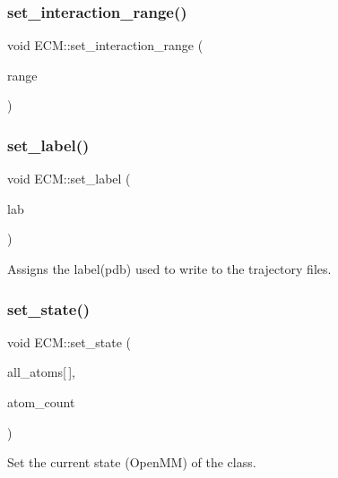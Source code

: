 \subsubsection{\texorpdfstring{set\_interaction\_range()}{set\_interaction\_range()}}
{\footnotesize\ttfamily void E\+C\+M\+::set\+\_\+interaction\+\_\+range (\begin{DoxyParamCaption}\item[{double}]{range }\end{DoxyParamCaption})\hspace{0.3cm}{\ttfamily [inline]}}

\mbox{\label{classECM_aa2f9122b1b849ab31856464889d328f4}} 
\subsubsection{\texorpdfstring{set\_label()}{set\_label()}}
{\footnotesize\ttfamily void E\+C\+M\+::set\+\_\+label (\begin{DoxyParamCaption}\item[{std\+::string}]{lab }\end{DoxyParamCaption})\hspace{0.3cm}{\ttfamily [inline]}}

Assigns the label(pdb) used to write to the trajectory files. \mbox{\label{classECM_aa668c3991fcee9ac12c78383f0c0b0aa}} 
\subsubsection{\texorpdfstring{set\_state()}{set\_state()}}
{\footnotesize\ttfamily void E\+C\+M\+::set\+\_\+state (\begin{DoxyParamCaption}\item[{\mbox{\hyperlink{structMyAtomInfo}{My\+Atom\+Info}}}]{all\+\_\+atoms\mbox{[}$\,$\mbox{]},  }\item[{int}]{atom\+\_\+count }\end{DoxyParamCaption})}

Set the current state (Open\+MM) of the class. \mbox{\label{classECM_a27b1c92c5a5d332698d7ae7cad1c36e4}} 
